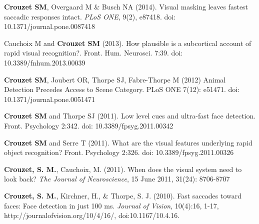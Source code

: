 \documentclass[margin,line]{resume}
\begin{document}
\begin{resume}


			
  \textbf{Crouzet SM}, Overgaard M \& Busch NA (2014). Visual masking leaves fastest saccadic responses intact. \textit{PLoS ONE}, 9(2), e87418. doi: 10.1371/journal.pone.0087418

  \vspace{-2mm} Cauchoix M and \textbf{Crouzet SM} (2013). How plausible is a subcortical account of rapid visual recognition?. Front. Hum. Neurosci. 7:39. doi: 10.3389/fnhum.2013.00039
	
	\vspace{-2mm} \textbf{Crouzet SM}, Joubert OR, Thorpe SJ, Fabre-Thorpe M (2012) Animal Detection Precedes Access to Scene Category. PLoS ONE 7(12): e51471. doi: 10.1371/journal.pone.0051471

	\vspace{-2mm} \textbf{Crouzet SM} and Thorpe SJ (2011). Low level cues and ultra-fast face detection. Front. Psychology 2:342. doi: 10.3389/fpsyg.2011.00342

	
	\vspace{-2mm} \textbf{Crouzet SM} and Serre T (2011). What are the visual features underlying rapid object recognition? Front. Psychology 2:326. doi: 10.3389/fpsyg.2011.00326

	\vspace{-2mm} \textbf{Crouzet, S. M.}, Cauchoix, M. (2011). When does the visual system need to look back?  \textit{The Journal of Neuroscience}, 15 June 2011, 31(24): 8706-8707

	\vspace{-2mm} \textbf{Crouzet, S. M.}, Kirchner, H., \& Thorpe, S. J.  (2010). Fast saccades toward faces: Face detection in just 100 ms. \textit{Journal of Vision}, 10(4):16, 1-17, http://journalofvision.org/10/4/16/, doi:10.1167/10.4.16.
	

\end{resume}
\end{document}
